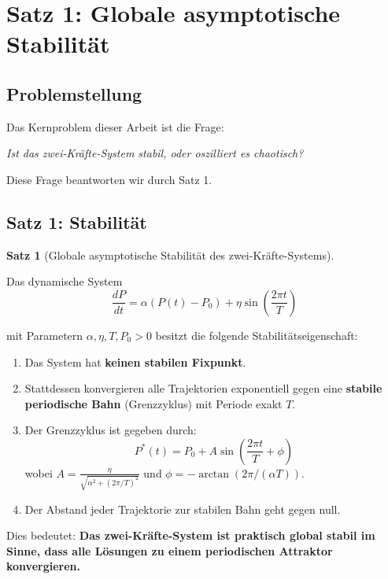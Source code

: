 \documentclass[a4paper, 12pt, twoside, openright]{report}
\theoremstyle{definition}
\theoremstyle{definition}
\newtheorem{satz}{Satz}[chapter]
\begin{document}
\section{Satz 1: Globale asymptotische Stabilität}

\subsection{Problemstellung}

Das Kernproblem dieser Arbeit ist die Frage:

\begin{center}
    \textit{Ist das zwei-Kräfte-System stabil, oder oszilliert es chaotisch?}
\end{center}

Diese Frage beantworten wir durch Satz 1.

\subsection{Satz 1: Stabilität}

\begin{satz}[Globale asymptotische Stabilität des zwei-Kräfte-Systems]\label{satz:stabilitaet}
    
    Das dynamische System
    \begin{equation}
        \frac{dP}{dt} = \alpha(P(t) - P_0) + \eta \sin\left(\frac{2\pi t}{T}\right)
    \end{equation}
    
    mit Parametern $\alpha, \eta, T, P_0 > 0$ besitzt die folgende Stabilitätseigenschaft:
    
    \begin{enumerate}
        \item Das System hat \textbf{keinen stabilen Fixpunkt}.
        \item Stattdessen konvergieren alle Trajektorien exponentiell gegen eine \textbf{stabile periodische Bahn} (Grenzzyklus) mit Periode exakt $T$.
        \item Der Grenzzyklus ist gegeben durch:
        \begin{equation}
            P^*(t) = P_0 + A \sin\left(\frac{2\pi t}{T} + \phi\right)
        \end{equation}
        wobei $A = \frac{\eta}{\sqrt{\alpha^2 + (2\pi/T)^2}}$ und $\phi = -\arctan(2\pi / (\alpha T))$.
        \item Der Abstand jeder Trajektorie zur stabilen Bahn geht gegen null.
    \end{enumerate}
    
    Dies bedeutet: \textbf{Das zwei-Kräfte-System ist praktisch global stabil im Sinne, dass alle Lösungen zu einem periodischen Attraktor konvergieren.}
\end{satz}
\end{document}
